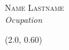 \documentclass[11pt, a4paper]{article}
\newenvironment{aside}{%
  \let\oldsection\section
  \renewcommand{\section}[1]{
    \par\vspace{\baselineskip}{\Large\headingfont\color{pblue} ##1}
  }
  \begin{textblock}{4}(2.0, 0.60)
  \begin{flushright}
  \obeycr
}{%
  \restorecr
  \end{flushright}
  \end{textblock}
  \let\section\oldsection
}
\begin{document}
\noindent
\begin{flushright}
\textsc{\huge Name Lastname}\\
\emph{Ocupation}
\end{flushright}



\onehalfspacing
\begin{aside}


\end{aside}



\end{document}
